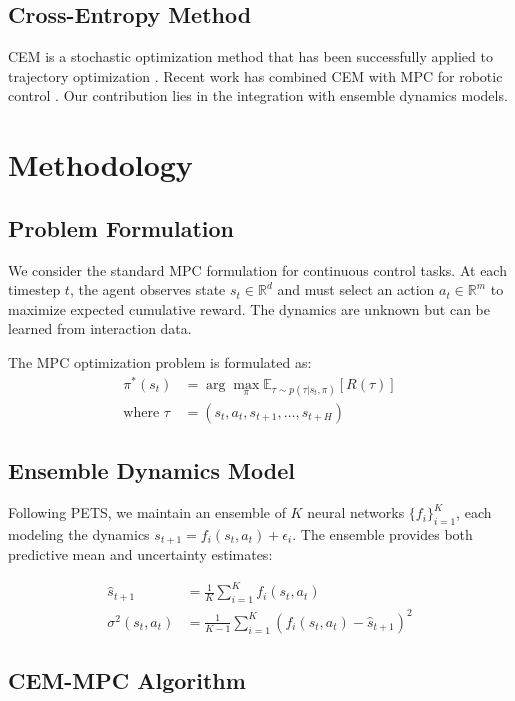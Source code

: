 \documentclass[10pt,twocolumn,letterpaper]{article}
\begin{document}
\subsection{Cross-Entropy Method}

CEM \cite{rubinstein2004cross} is a stochastic optimization method that has been successfully applied to trajectory optimization \cite{kobilarov2012cross}. Recent work has combined CEM with MPC for robotic control \cite{williams2017model}. Our contribution lies in the integration with ensemble dynamics models.

\section{Methodology}

\subsection{Problem Formulation}

We consider the standard MPC formulation for continuous control tasks. At each timestep $t$, the agent observes state $s_t \in \mathbb{R}^d$ and must select an action $a_t \in \mathbb{R}^m$ to maximize expected cumulative reward. The dynamics are unknown but can be learned from interaction data.

The MPC optimization problem is formulated as:
\begin{align}
\pi^*(s_t) &= \arg\max_{\pi} \mathbb{E}_{\tau \sim p(\tau|s_t,\pi)} [R(\tau)] \\
\text{where } \tau &= (s_t, a_t, s_{t+1}, \dots, s_{t+H})
\end{align}

\subsection{Ensemble Dynamics Model}

Following PETS, we maintain an ensemble of $K$ neural networks $\{f_i\}_{i=1}^K$, each modeling the dynamics $s_{t+1} = f_i(s_t, a_t) + \epsilon_i$. The ensemble provides both predictive mean and uncertainty estimates:

\begin{align}
\hat{s}_{t+1} &= \frac{1}{K} \sum_{i=1}^K f_i(s_t, a_t) \\
\sigma^2(s_t, a_t) &= \frac{1}{K-1} \sum_{i=1}^K (f_i(s_t, a_t) - \hat{s}_{t+1})^2
\end{align}

\subsection{CEM-MPC Algorithm}
\end{document}
